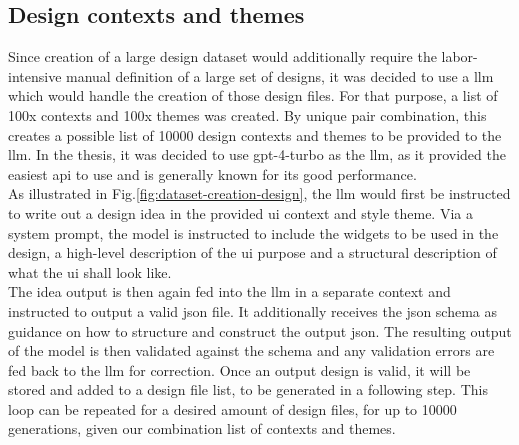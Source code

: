 \documentclass[Bachelor, BIC, english, fhCitStyle, IEEE]{BASE/twbook} %
\begin{document}
\subsection{Design contexts and themes}
Since creation of a large design dataset would additionally require the labor-intensive manual definition of a large set of designs, it was decided to use a \ac{llm} which would handle the creation of those design files. For that purpose, a list of 100x contexts and 100x themes was created. By unique pair combination, this creates a possible list of 10000 design contexts and themes to be provided to the \ac{llm}. In the thesis, it was decided to use gpt-4-turbo as the \ac{llm}, as it provided the easiest \ac{api} to use and is generally known for its good performance.\\
As illustrated in Fig.\ref{fig:dataset-creation-design}, the \ac{llm} would first be instructed to write out a design idea in the provided \ac{ui} context and style theme. Via a system prompt, the model is instructed to include the widgets to be used in the design, a high-level description of the \ac{ui} purpose and a structural description of what the \ac{ui} shall look like.\\
The idea output is then again fed into the \ac{llm} in a separate context and instructed to output a valid \ac{json} file. It additionally receives the \ac{json} schema as guidance on how to structure and construct the output \ac{json}. The resulting output of the model is then validated against the schema and any validation errors are fed back to the \ac{llm} for correction. Once an output design is valid, it will be stored and added to a design file list, to be generated in a following step. This loop can be repeated for a desired amount of design files, for up to 10000 generations, given our combination list of contexts and themes.
\end{document}
